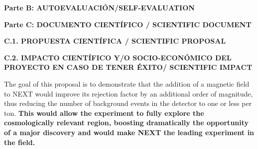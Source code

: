 \documentclass[a4paper,11pt,oneside]{article}
\begin{document}
 \vspace{12pt}

\newpage
\setcounter{page}{1}

\vspace{3pt}
\begin{tcolorbox}[colback=yellow,arc=0pt,outer arc=0pt,colframe=black,boxrule=0.6pt,left=0mm]
  \noindent\textbf{Parte B: AUTOEVALUACIÓN/SELF-EVALUATION}
\end{tcolorbox}



\newpage
\setcounter{page}{1}

\vspace{6pt}
\begin{tcolorbox}[colback=yellow,arc=0pt,outer arc=0pt,colframe=black,boxrule=0.6pt,left=0mm]
  \noindent\textbf{Parte C: DOCUMENTO CIENTÍFICO / SCIENTIFIC DOCUMENT}
\end{tcolorbox}

\vspace{12pt}

\noindent\textbf{C.1. PROPUESTA CIENTÍFICA / SCIENTIFIC PROPOSAL}

%

\vspace{12pt}

\noindent\textbf{C.2. IMPACTO CIENTÍFICO Y/O SOCIO-ECONÓMICO DEL PROYECTO EN CASO DE TENER ÉXITO/ SCIENTIFIC IMPACT}

The goal of this proposal is to demonstrate that the addition of a magnetic field to NEXT would improve its rejection factor by an additional order of magnitude, thus reducing the number of background events in the detector to one or less per ton. {\bf This would allow the experiment to fully explore the cosmologically relevant region, boosting dramatically the opportunity of a major discovery and would make NEXT the leading experiment in the field.}
\end{document}
